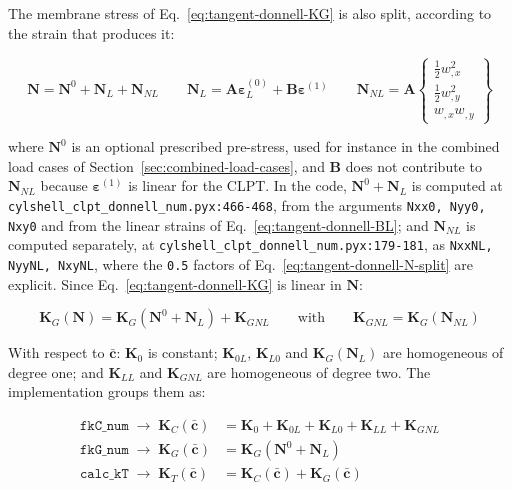 The membrane stress of Eq.~\ref{eq:tangent-donnell-KG} is also split, according to the strain that produces it:

\begin{equation}\label{eq:tangent-donnell-N-split}
	\boldsymbol{N} = \boldsymbol{N}^0 + \boldsymbol{N}_L + \boldsymbol{N}_{NL}
	\qquad
	\boldsymbol{N}_L = \boldsymbol{A}\boldsymbol{\varepsilon}^{(0)}_L + \boldsymbol{B}\boldsymbol{\varepsilon}^{(1)}
	\qquad
	\boldsymbol{N}_{NL} = \boldsymbol{A} \left\{ \begin{matrix} \frac{1}{2} w_{,x}^2 \\[2pt] \frac{1}{2} w_{,y}^2 \\[2pt] w_{,x} w_{,y} \end{matrix} \right\}
\end{equation}

\noindent where $\boldsymbol{N}^0$ is an optional prescribed pre-stress, used for instance in the combined load cases of Section~\ref{sec:combined-load-cases}, and $\boldsymbol{B}$ does not contribute to $\boldsymbol{N}_{NL}$ because $\boldsymbol{\varepsilon}^{(1)}$ is linear for the CLPT. In the code, $\boldsymbol{N}^0 + \boldsymbol{N}_L$ is computed at \texttt{cylshell\_clpt\_donnell\_num.pyx:466-468}, from the arguments \texttt{Nxx0, Nyy0, Nxy0} and from the linear strains of Eq.~\ref{eq:tangent-donnell-BL}; and $\boldsymbol{N}_{NL}$ is computed separately, at \texttt{cylshell\_clpt\_donnell\_num.pyx:179-181}, as \texttt{NxxNL, NyyNL, NxyNL}, where the \texttt{0.5} factors of Eq.~\ref{eq:tangent-donnell-N-split} are explicit. Since Eq.~\ref{eq:tangent-donnell-KG} is linear in $\boldsymbol{N}$:

\begin{equation}\label{eq:tangent-donnell-KGNL}
	\boldsymbol{K}_G(\boldsymbol{N}) = \boldsymbol{K}_G(\boldsymbol{N}^0 + \boldsymbol{N}_L) + \boldsymbol{K}_{GNL}
	\qquad \text{with} \qquad
	\boldsymbol{K}_{GNL} = \boldsymbol{K}_G(\boldsymbol{N}_{NL})
\end{equation}

With respect to $\bar{\boldsymbol{c}}$: $\boldsymbol{K}_0$ is constant; $\boldsymbol{K}_{0L}$, $\boldsymbol{K}_{L0}$ and $\boldsymbol{K}_G(\boldsymbol{N}_L)$ are homogeneous of degree one; and $\boldsymbol{K}_{LL}$ and $\boldsymbol{K}_{GNL}$ are homogeneous of degree two. The implementation groups them as:

\begin{equation}\label{eq:tangent-donnell-grouping}
	\begin{aligned}
		\texttt{fkC\_num} \;\rightarrow\; \boldsymbol{K}_C(\bar{\boldsymbol{c}}) &= \boldsymbol{K}_0 + \boldsymbol{K}_{0L} + \boldsymbol{K}_{L0} + \boldsymbol{K}_{LL} + \boldsymbol{K}_{GNL} \\
		\texttt{fkG\_num} \;\rightarrow\; \boldsymbol{K}_G(\bar{\boldsymbol{c}}) &= \boldsymbol{K}_G(\boldsymbol{N}^0 + \boldsymbol{N}_L) \\
		\texttt{calc\_kT} \;\rightarrow\; \boldsymbol{K}_T(\bar{\boldsymbol{c}}) &= \boldsymbol{K}_C(\bar{\boldsymbol{c}}) + \boldsymbol{K}_G(\bar{\boldsymbol{c}})
	\end{aligned}
\end{equation}

